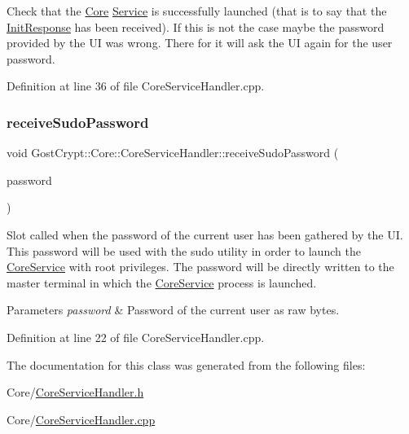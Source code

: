 Check that the \hyperlink{namespace_gost_crypt_1_1_core}{Core} \hyperlink{class_gost_crypt_1_1_core_1_1_service}{Service} is successfully launched (that is to say that the \hyperlink{struct_gost_crypt_1_1_core_1_1_init_response}{Init\+Response} has been received). If this is not the case maybe the password provided by the UI was wrong. There for it will ask the UI again for the user password. 



Definition at line 36 of file Core\+Service\+Handler.\+cpp.

\mbox{\label{class_gost_crypt_1_1_core_1_1_core_service_handler_a1ae93e4e0b18855583cd1f3cb071e540}} 
\subsubsection{\texorpdfstring{receive\+Sudo\+Password}{receiveSudoPassword}}
{\footnotesize\ttfamily void Gost\+Crypt\+::\+Core\+::\+Core\+Service\+Handler\+::receive\+Sudo\+Password (\begin{DoxyParamCaption}\item[{Q\+Shared\+Pointer$<$ Q\+Byte\+Array $>$}]{password }\end{DoxyParamCaption})\hspace{0.3cm}{\ttfamily [slot]}}



Slot called when the password of the current user has been gathered by the UI. This password will be used with the sudo utility in order to launch the \hyperlink{class_gost_crypt_1_1_core_1_1_core_service}{Core\+Service} with root privileges. The password will be directly written to the master terminal in which the \hyperlink{class_gost_crypt_1_1_core_1_1_core_service}{Core\+Service} process is launched. 


\begin{DoxyParams}{Parameters}
{\em password} & Password of the current user as raw bytes. \\
\hline
\end{DoxyParams}


Definition at line 22 of file Core\+Service\+Handler.\+cpp.



The documentation for this class was generated from the following files\+:\begin{DoxyCompactItemize}
\item 
Core/\hyperlink{_core_service_handler_8h}{Core\+Service\+Handler.\+h}\item 
Core/\hyperlink{_core_service_handler_8cpp}{Core\+Service\+Handler.\+cpp}\end{DoxyCompactItemize}
